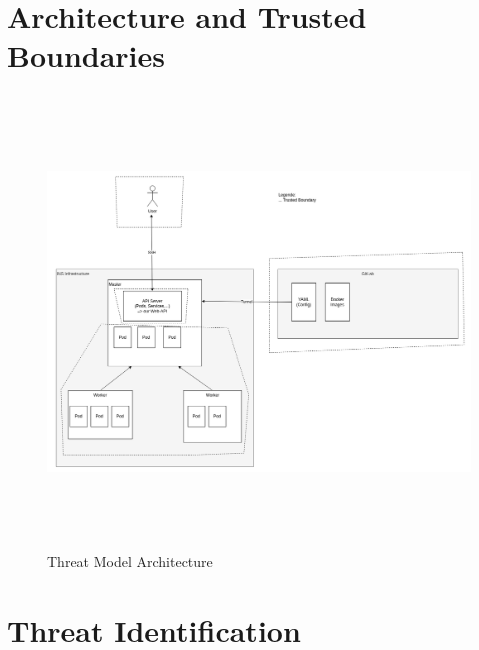 \section{Architecture and Trusted Boundaries}

\begin{figure}
    \centering
    \caption{Threat Model Architecture}
    \label{fig:threat-model-architecture}
    \includegraphics[height=12cm]{resources/architecture_threat_model.png}
\end{figure}


\section{Threat Identification}

